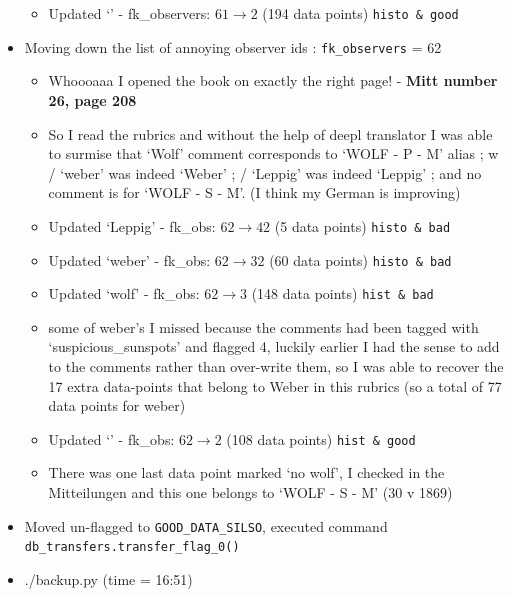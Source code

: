 \documentclass[12pt]{article}
\begin{document}
\begin{itemize}
\begin{itemize}
        \item Updated `' -  fk\_observers: $61\to 2$ (194 data points) \texttt{histo \& good}
    \end{itemize}
    \item Moving down the list of annoying observer ids : \texttt{fk\_observers} = 62
    \begin{itemize}
        \item Whoooaaa I opened the book on exactly the right page! - \textbf{Mitt number 26, page 208}
        \item So I read the rubrics and without the help of deepl translator I was able to surmise that `Wolf' comment corresponds to `WOLF - P - M' alias ; w / `weber' was indeed `Weber' ; \dag / `Leppig' was indeed `Leppig' ; and no comment is for `WOLF - S - M'. (I think my German is improving)
        \item Updated `Leppig' - fk\_obs: $62\to 42$ (5 data points) \texttt{histo \& bad}
        \item Updated `weber' - fk\_obs: $62\to 32$ (60 data points) \texttt{histo \& bad}
        \item Updated `wolf' - fk\_obs: $62\to 3$ (148 data points) \texttt{hist \& bad}
        \item some of weber's I missed because the comments had been tagged with `suspicious\_sunspots' and flagged 4, luckily earlier I had the sense to add to the comments rather than over-write them, so I was able to recover the 17 extra data-points that belong to Weber in this rubrics (so a total of 77 data points for weber)
        \item Updated `' - fk\_obs: $62\to 2$ (108 data points) \texttt{hist \& good}
        \item There was one last data point marked `no wolf', I checked in the Mitteilungen and this one belongs to `WOLF - S - M' (30 v 1869) 
    \end{itemize}
    \item Moved un-flagged to \texttt{GOOD\_DATA\_SILSO}, executed command \texttt{db\_transfers.transfer\_flag\_0()}
    \item ./backup.py (time = 16:51)
\end{itemize}
\end{document}
